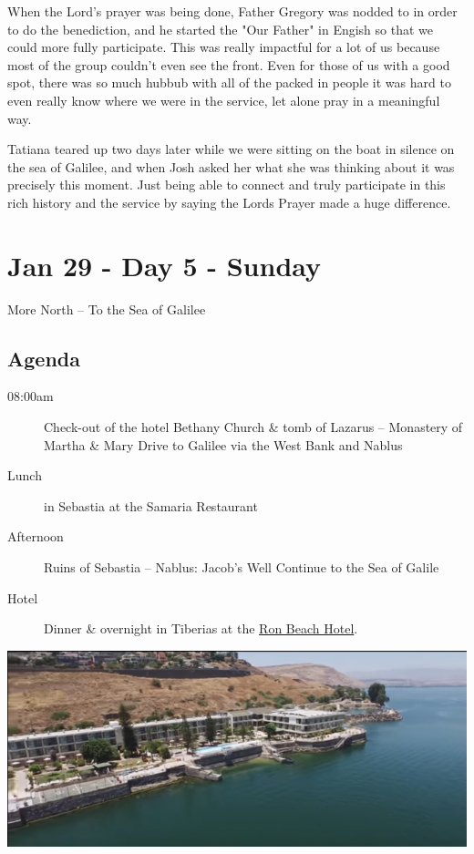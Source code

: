 \documentclass[letterpaper]{report}
\begin{document}
When the Lord's prayer was being done, Father Gregory was nodded to in order to do the benediction,
and he started the "Our Father" in Engish
so that we could more fully participate.
This was really impactful for a lot of us because most of the group couldn't even see the front.
Even for those of us with a good spot,
there was so much hubbub with all of the packed in people it was
hard to even really know where we were in the service,
let alone pray in a meaningful way.

Tatiana teared up two days later while we
were sitting on the boat in silence on the sea of Galilee,
and when Josh asked her what she was thinking about it was precisely this moment.
Just being able to connect and truly participate in this rich history and the service by saying the Lords Prayer made a huge difference.

\clearpage
\chapter{Jan 29 - Day 5 - Sunday}
More North -- To the Sea of Galilee
\section{Agenda}
\begin{description}
	\item[08:00am] Check-out of the hotel Bethany
	  \subitem Church \& tomb of Lazarus – Monastery of Martha \& Mary
	  \subitem Drive to Galilee via the West Bank and Nablus
	\item[Lunch] in Sebastia at the Samaria Restaurant
	\item[Afternoon] Ruins of Sebastia – Nablus: Jacob’s Well
	  \subitem Continue to the Sea of Galile
	\item[Hotel] Dinner \& overnight in Tiberias at the
	  \href{http://www.ronbeachhotel.com/}{Ron Beach Hotel}.
\end{description}

\includegraphics[width=\textwidth]{RonBeachHotel}
\end{document}
